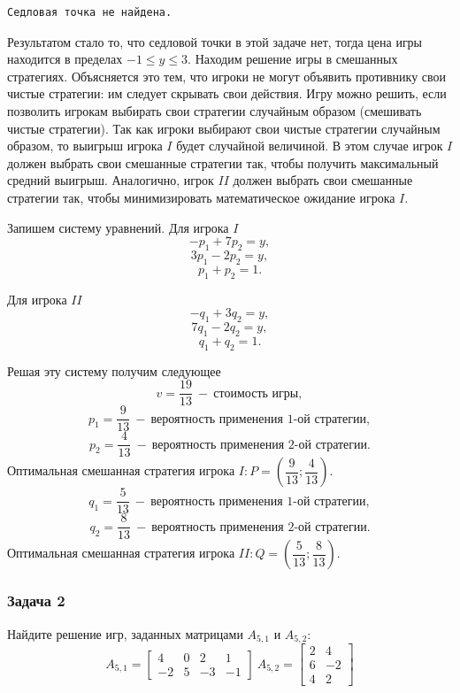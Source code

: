 \documentclass[11pt]{article}
\begin{document}
    \begin{Verbatim}[commandchars=\\\{\}]
Седловая точка не найдена.
    \end{Verbatim}

    Результатом стало то, что седловой точки в этой задаче нет, тогда цена
игры находится в пределах \(-1 \leq y \leq 3\). Находим решение игры в
смешанных стратегиях. Объясняется это тем, что игроки не могут объявить
противнику свои чистые стратегии: им следует скрывать свои действия.
Игру можно решить, если позволить игрокам выбирать свои стратегии
случайным образом (смешивать чистые стратегии). Так как игроки выбирают
свои чистые стратегии случайным образом, то выигрыш игрока \(I\) будет
случайной величиной. В этом случае игрок \(I\) должен выбрать свои
смешанные стратегии так, чтобы получить максимальный средний выигрыш.
Аналогично, игрок \(II\) должен выбрать свои смешанные стратегии так,
чтобы минимизировать математическое ожидание игрока \(I\).

Запишем систему уравнений. Для игрока \(I\) \[-p_1+7p_2 = y,\]
 \[3p_1-2p_2 = y,\]  \[p_1+p_2 = 1.\]

Для игрока \(II\) \[-q_1+3q_2 = y,\]  \[7q_1-2q_2 = y,\]
 \[q_1+q_2 = 1.\]

Решая эту систему получим следующее
\[v = \dfrac{19}{13}\ -\ \text{стоимость игры},\]
\[p_1 = \dfrac{9}{13}\ - \ \text{вероятность применения 1-ой стратегии},\]
\[p_2 = \dfrac{4}{13}\ - \ \text{вероятность применения 2-ой стратегии}.\]
Оптимальная смешанная стратегия игрока
\(I: P = (\dfrac{9}{13}; \dfrac{4}{13}).\)
\[q_1 = \dfrac{5}{13}\ - \ \text{вероятность применения 1-ой стратегии},\]
\[q_2 = \dfrac{8}{13}\ - \ \text{вероятность применения 2-ой стратегии}.\]
Оптимальная смешанная стратегия игрока
\(II: Q = (\dfrac{5}{13}; \dfrac{8}{13}).\)

    \subsubsection*{Задача 2}

Найдите решение игр, заданных матрицами \(A_{5, 1}\) и \(A_{5, 2}\):
\[A_{5, 1}=\begin{bmatrix}
4 & 0 & 2 & 1\\
-2 & 5 & -3 & -1
\end{bmatrix} \ 
A_{5, 2} = \begin{bmatrix}
2 & 4 \\
6 & -2 \\
4 & 2
\end{bmatrix}\]
\end{document}
